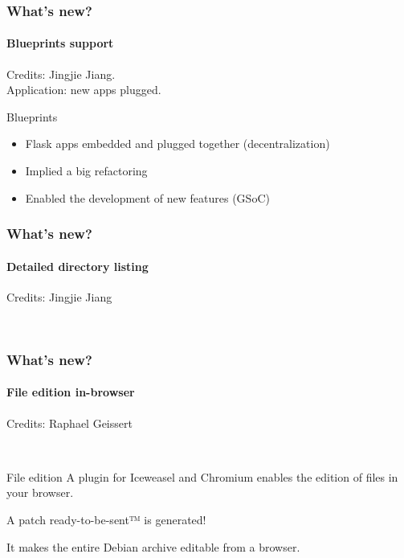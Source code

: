 \documentclass{beamer}
\begin{document}
\begin{frame}
  \frametitle{What's new?}
  \framesubtitle{Blueprints support}
  Credits: Jingjie Jiang.\\
  Application: new apps plugged.
  \vspace{7mm}
  ~\\  
  \begin{block}{Blueprints}
    \begin{itemize}
    \item Flask apps embedded and plugged together (decentralization)
    \item Implied a big refactoring
    \item Enabled the development of new features (GSoC)
    \end{itemize}
  \end{block}
\end{frame}

\begin{frame}
  \frametitle{What's new?}
  \framesubtitle{Detailed directory listing}
  Credits: Jingjie Jiang
  
  ~\\
\end{frame}

\begin{frame}
  \frametitle{What's new?}
  \framesubtitle{File edition in-browser}
  Credits: Raphael Geissert
  
  ~\\
  \begin{block}{File edition}
    A plugin for Iceweasel and Chromium enables the edition of files in
    your browser.

    A patch ready-to-be-sent™ is generated!

    It makes the entire Debian archive editable from a browser.
  \end{block}
\end{frame}
\end{document}
